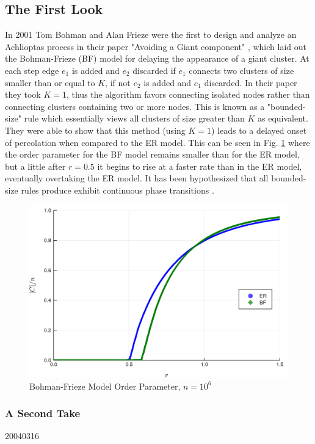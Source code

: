 \subsection{The First Look}
In 2001 Tom Bohman and Alan Frieze were the first to design and analyze an Achlioptas process in their paper "Avoiding a Giant component" \cite{BF}, which laid out the Bohman-Frieze (BF) model for delaying the appearance of a giant cluster.
At each step edge $e_1$ is added and $e_2$ discarded if $e_1$ connects two clusters of size smaller than or equal to $K$, if not $e_2$ is added and $e_1$ discarded.
In their paper they took $K = 1$, thus the algorithm favors connecting isolated nodes rather than connecting clusters containing two or more nodes.
This is known as a "bounded-size" rule which essentially views all clusters of size greater than $K$ as equivalent.
They were able to show that this method (using $K = 1$) leads to a delayed onset of percolation when compared to the ER model.
This can be seen in Fig. \ref{fig:ER_BF_transition} where the order parameter for the BF model remains smaller than for the ER model, but a little after $r = 0.5$ it begins to rise at a faster rate than in the ER model, eventually overtaking the ER model.
It has been hypothesized that all bounded-size rules produce exhibit continuous phase transitions \cite{Spencer_Wormald}.

\begin{figure}[H]
	\centering
	\includegraphics[width=350pt]{images/ER_BF_1e6_order_param.png}
	\caption{Bohman-Frieze Model Order Parameter, $n = 10^6$}
	\label{fig:ER_BF_transition}
\end{figure}



\subsubsection{A Second Take}
20040316








